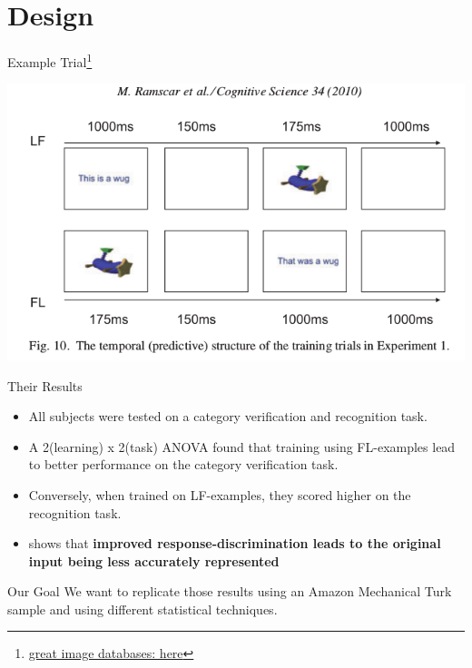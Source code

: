 \documentclass{beamer}\usepackage[]{graphicx}\usepackage[]{color}
\begin{document}
\section{Design}
\begin{frame}{Example Trial\footnote{\href{http://wiki.cnbc.cmu.edu/Image_Databases}{great image databases: here}}}
    \begin{center}
        \includegraphics[scale=.45]{figure/trial.png}
	\end{center}
\end{frame}

\begin{frame}{Their Results}
    \begin{itemize}[<+->]
        \item All subjects were tested on a category verification and recognition task.
        \item A 2(learning) x 2(task) ANOVA found that training using FL-examples lead to better
              performance on the category verification task.
        \item Conversely, when trained on LF-examples, they scored higher on the recognition task.
        
        \item shows that \textbf{improved response-discrimination leads to the original input being less accurately represented}
    \end{itemize}
\end{frame}

\begin{frame}{Our Goal}
We want to replicate those results using an Amazon Mechanical Turk sample and using different statistical techniques.
\end{frame}
\end{document}
